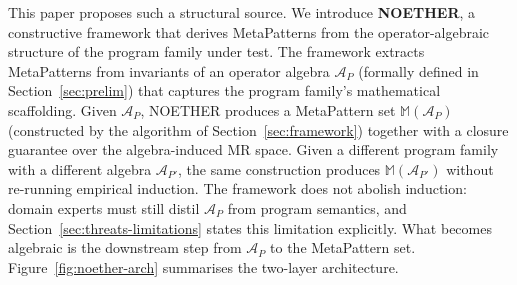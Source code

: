 \documentclass[acmsmall, screen]{acmart}
\begin{document}
This paper proposes such a structural source. We introduce \textbf{NOETHER}, a constructive framework that derives MetaPatterns from the operator-algebraic structure of the program family under test. The framework extracts MetaPatterns from invariants of an operator algebra $\mathcal{A}_P$ (formally defined in Section~\ref{sec:prelim}) that captures the program family's mathematical scaffolding. Given $\mathcal{A}_P$, NOETHER produces a MetaPattern set $\mathbb{M}(\mathcal{A}_P)$ (constructed by the algorithm of Section~\ref{sec:framework}) together with a closure guarantee over the algebra-induced MR space. Given a different program family with a different algebra $\mathcal{A}_{P'}$, the same construction produces $\mathbb{M}(\mathcal{A}_{P'})$ without re-running empirical induction. The framework does not abolish induction: domain experts must still distil $\mathcal{A}_P$ from program semantics, and Section~\ref{sec:threats-limitations} states this limitation explicitly. What becomes algebraic is the downstream step from $\mathcal{A}_P$ to the MetaPattern set. Figure~\ref{fig:noether-arch} summarises the two-layer architecture.
\end{document}
